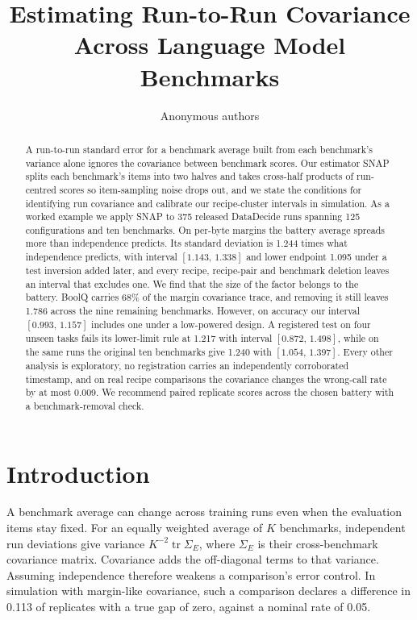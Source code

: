 \documentclass{article}
\title{Estimating Run-to-Run Covariance\\Across Language Model Benchmarks}
\author{Anonymous authors}
\newcommand{\ci}[2]{\ensuremath{[#1,\,#2]}}
\newcommand{\Sig}{\Sigma_E}
\begin{document}
\maketitle
\begin{abstract}
A run-to-run standard error for a benchmark average built from each benchmark's variance alone ignores the covariance between benchmark scores. Our estimator SNAP splits each benchmark's items into two halves and takes cross-half products of run-centred scores so item-sampling noise drops out, and we state the conditions for identifying run covariance and calibrate our recipe-cluster intervals in simulation. As a worked example we apply SNAP to 375 released DataDecide runs spanning 125 configurations and ten benchmarks. On per-byte margins the battery average spreads more than independence predicts. Its standard deviation is 1.244 times what independence predicts, with interval \ci{1.143}{1.338} and lower endpoint 1.095 under a test inversion added later, and every recipe, recipe-pair and benchmark deletion leaves an interval that excludes one. We find that the size of the factor belongs to the battery. BoolQ carries 68\% of the margin covariance trace, and removing it still leaves 1.786 across the nine remaining benchmarks. However, on accuracy our interval \ci{0.993}{1.157} includes one under a low-powered design. A registered test on four unseen tasks fails its lower-limit rule at 1.217 with interval \ci{0.872}{1.498}, while on the same runs the original ten benchmarks give 1.240 with \ci{1.054}{1.397}. Every other analysis is exploratory, no registration carries an independently corroborated timestamp, and on real recipe comparisons the covariance changes the wrong-call rate by at most 0.009. We recommend paired replicate scores across the chosen battery with a benchmark-removal check.
\end{abstract}

\section{Introduction}
A benchmark average can change across training runs even when the evaluation items stay fixed. For an equally weighted average of $K$ benchmarks, independent run deviations give variance $K^{-2}\operatorname{tr}\Sig$, where $\Sig$ is their cross-benchmark covariance matrix. Covariance adds the off-diagonal terms to that variance. Assuming independence therefore weakens a comparison's error control. In simulation with margin-like covariance, such a comparison declares a difference in 0.113 of replicates with a true gap of zero, against a nominal rate of 0.05.
\end{document}

